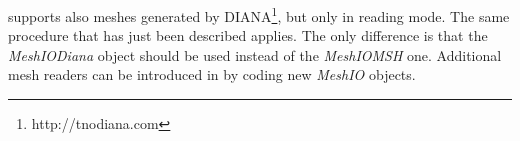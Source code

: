 \akantu supports also meshes generated by
DIANA\footnote{http://tnodiana.com}, but only in reading mode. The
same procedure that has just been described applies. The only
difference is that the \textit{MeshIODiana} object should be used
instead of the \textit{MeshIOMSH} one. Additional mesh readers can be
introduced in \akantu by coding new \textit{MeshIO} objects.

